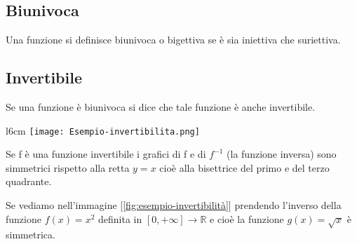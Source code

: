 \subsection{Biunivoca}
\begin{definition}[Biunivoca]
Una funzione si definisce biunivoca o bigettiva se è sia iniettiva che suriettiva.
\end{definition}

\subsection{Invertibile}
\begin{definition}[Invertibile]
Se una funzione è biunivoca si dice che tale funzione è anche invertibile.
\end{definition}
\begin{wrapfigure}{l}{6cm}
    \centering
    \texttt{[image: Esempio-invertibilita.png]}
    \caption{$f(x) = x^2$ e $g(x) = \sqrt{x}$}
    \label{fig:esempio-invertibilità}
\end{wrapfigure}
Se f è una funzione invertibile i grafici di f e di $f^{-1}$ (la funzione inversa) sono simmetrici rispetto alla retta $y=x$ cioè alla bisettrice del primo e del terzo quadrante. \\
\begin{example}
Se vediamo nell'immagine [\ref{fig:esempio-invertibilità}] prendendo l'inverso della funzione $f(x) = x^2$ definita in $[0, +\infty] \longrightarrow \mathbb{R}$ e cioè la funzione $g(x) = \sqrt{x}$ è simmetrica.
\\ \\ \\ \\ \\
\end{example}

